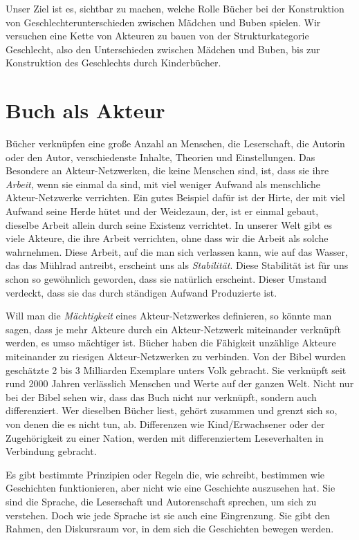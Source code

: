 Unser Ziel ist es, sichtbar zu machen, welche Rolle Bücher bei der Konstruktion von Geschlechterunterschieden zwischen Mädchen und Buben spielen. Wir versuchen eine Kette von Akteuren zu bauen von der Strukturkategorie Geschlecht, also den Unterschieden zwischen Mädchen und Buben, bis zur Konstruktion des Geschlechts durch Kinderbücher.

\section{Buch als Akteur}

Bücher verknüpfen eine große Anzahl an Menschen, die Leserschaft, die Autorin oder den Autor, verschiedenste Inhalte, Theorien und Einstellungen.
Das Besondere an Akteur-Netzwerken, die keine Menschen sind, ist, dass sie ihre \emph{Arbeit}, wenn sie einmal da sind, mit viel weniger Aufwand als menschliche Akteur-Netzwerke verrichten.
Ein gutes Beispiel dafür ist der Hirte, der mit viel Aufwand seine Herde hütet und der Weidezaun, der, ist er einmal gebaut, dieselbe Arbeit allein durch seine Existenz verrichtet.
In unserer Welt gibt es viele Akteure, die ihre Arbeit verrichten, ohne dass wir die Arbeit als solche wahrnehmen.
Diese Arbeit, auf die man sich verlassen kann, wie auf das Wasser, das das Mühlrad antreibt, erscheint uns als \emph{Stabilität}.
Diese Stabilität ist für uns schon so gewöhnlich geworden, dass sie natürlich erscheint. Dieser Umstand verdeckt, dass sie das durch ständigen Aufwand Produzierte ist.

Will man die \emph{Mächtigkeit} eines Akteur-Netzwerkes definieren, so könnte man sagen, dass je mehr Akteure durch ein Akteur-Netzwerk miteinander verknüpft werden, es umso mächtiger ist.
Bücher haben die Fähigkeit unzählige Akteure miteinander zu riesigen Akteur-Netzwerken zu verbinden.
Von der Bibel wurden \zB geschätzte 2 bis 3 Milliarden Exemplare unters Volk gebracht. Sie verknüpft seit rund 2000 Jahren verlässlich Menschen und Werte auf der ganzen Welt.
Nicht nur bei der Bibel sehen wir, dass das Buch nicht nur verknüpft, sondern auch differenziert. Wer dieselben Bücher liest, gehört zusammen und grenzt sich so, von denen die es nicht tun, ab. Differenzen wie Kind/Erwachsener oder der Zugehörigkeit zu einer Nation, werden mit differenziertem Leseverhalten in Verbindung gebracht.
\parencites[Kap.\,3 in][]{Postman2011}[50]{McLuhan2012}

Es gibt bestimmte Prinzipien oder  Regeln die, wie  schreibt, bestimmen wie Geschichten funktionieren, aber nicht wie eine Geschichte auszusehen hat.  Sie sind die Sprache, die Leserschaft und Autorenschaft sprechen, um sich zu verstehen. \parencite[30]{Daehnke2003} Doch wie jede Sprache ist sie auch eine Eingrenzung. Sie gibt den Rahmen, den Diskursraum vor, in dem sich die Geschichten bewegen werden.

